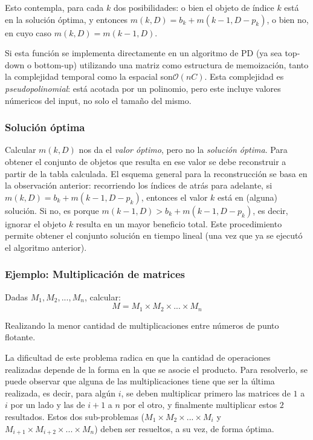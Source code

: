 \documentclass[a4paper]{report}
\newcommand{\BigO}[1]{\ensuremath{\mathcal{O}(#1)}}
\begin{document}
Esto contempla, para cada $k$ dos posibilidades: o bien el objeto de índice $k$ está en la solución óptima, y entonces $m(k, D) = b_k + m(k - 1, D - p_k)$, o bien no, en cuyo caso $m(k, D) = m(k - 1, D)$.

Si esta función se implementa directamente en un algoritmo de PD (ya sea top-down o bottom-up) utilizando una matriz como estructura de memoización, tanto la complejidad temporal como la espacial son\BigO{nC}. Esta complejidad es \textit{pseudopolinomial}: está acotada por un polinomio, pero este incluye valores númericos del input, no solo el tamaño del mismo.

\subsubsection{Solución óptima}
\label{reconstruccion-solucion}

Calcular $m(k, D)$ nos da el \textit{valor óptimo}, pero no la \textit{solución óptima}. Para obtener el conjunto de objetos que resulta en ese valor se debe reconstruir a partir de la tabla calculada. El esquema general para la reconstrucción se basa en la observación anterior: recorriendo los índices de atrás para adelante, si $m(k, D) = b_k + m(k - 1, D - p_k)$, entonces el valor $k$ está en (alguna) solución. Si no, es porque $m(k - 1, D) > b_k + m(k - 1, D - p_k)$, es decir, ignorar el objeto $k$ resulta en un mayor beneficio total. Este procedimiento permite obtener el conjunto solución en tiempo lineal (una vez que ya se ejecutó el algoritmo anterior).

\subsubsection{Ejemplo: Multiplicación de matrices}

\begin{problema}
    Dadas $M_1, M_2, ..., M_n$, calcular:
    $$M = M_1 \times M_2 \times ... \times M_n$$

    Realizando la menor cantidad de multiplicaciones entre números de punto flotante.
\end{problema}

La dificultad de este problema radica en que la cantidad de operaciones realizadas depende de la forma en la que se asocie el producto. Para resolverlo, se puede observar que alguna de las multiplicaciones tiene que ser la última realizada, es decir, para algún $i$, se deben multiplicar primero las matrices de $1$ a $i$ por un lado y las de $i + 1$ a $n$ por el otro, y finalmente multiplicar estos $2$ resultados. Estos dos sub-problemas ($M_1 \times M_2 \times ... \times M_i$ y $M_{i+1} \times M_{i+2}\times ... \times M_n$) deben ser resueltos, a su vez, de forma óptima.
\end{document}
